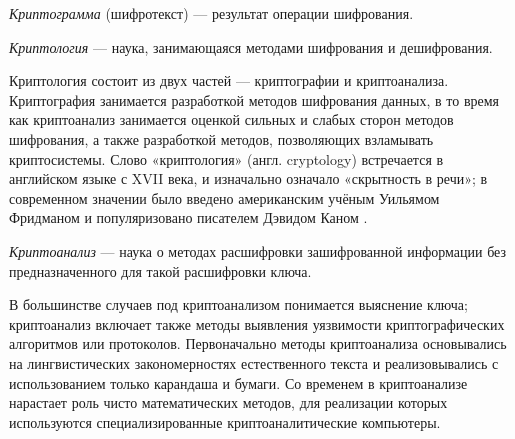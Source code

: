 \DEF\textit{Криптограмма} (шифротекст) --- результат операции шифрования.

\DEF\textit{Криптология} --- наука, занимающаяся методами шифрования и 
дешифрования. 

Криптология состоит из двух частей --- криптографии и криптоанализа. 
Криптография 
занимается разработкой методов шифрования данных, в то время как 
криптоанализ занимается оценкой сильных и слабых сторон методов 
шифрования, а также разработкой методов, позволяющих взламывать 
криптосистемы. Слово «криптология» (англ. cryptology) встречается в 
английском языке с XVII века, и изначально означало «скрытность в речи»; 
в современном значении было введено американским учёным Уильямом Фридманом 
и популяризовано писателем Дэвидом Каном \cite{khan-codebreakers}.

\DEF\textit{Криптоанализ} --- 
наука о методах расшифровки зашифрованной информации без предназначенного 
для такой расшифровки ключа.

В большинстве случаев под криптоанализом понимается выяснение ключа; 
криптоанализ включает также методы выявления уязвимости криптографических 
алгоритмов или протоколов. Первоначально методы криптоанализа основывались 
на лингвистических закономерностях естественного текста и реализовывались 
с использованием только карандаша и бумаги. Со временем в криптоанализе 
нарастает роль чисто математических методов, для реализации которых 
используются специализированные криптоаналитические компьютеры.
